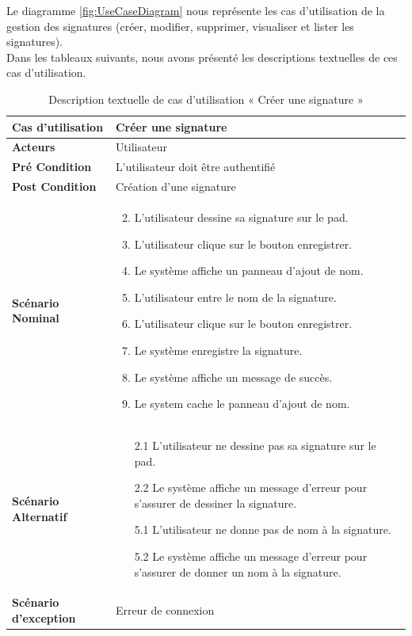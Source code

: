Le diagramme \ref{fig:UseCaseDiagram} nous représente les cas d'utilisation de la gestion des signatures (créer, modifier, supprimer, visualiser et lister les signatures). \\
Dans les tableaux suivants, nous avons présenté les descriptions textuelles de ces cas d'utilisation.


\begin{longtable}{|p{5cm}|p{10cm}|}
  \caption{Description textuelle de cas d'utilisation « Créer une signature »} \label{tab:use_case_create_signature}\\
\hline
\textbf{Cas d'utilisation}&Créer une signature\\
\hline
\textbf{Acteurs}&Utilisateur\\
\hline
\textbf{Pré Condition}&L'utilisateur doit être authentifié\\
\hline
\textbf{Post Condition}&Création d'une signature\\
\hline
\textbf{Scénario Nominal}&
\vspace{-\baselineskip}
\begin{enumerate}
    \setcounter{enumi}{1}
  \item L'utilisateur dessine sa signature sur le pad.
  \item L'utilisateur clique sur le bouton enregistrer.
  \item Le système affiche un panneau d'ajout de nom.
  \item L'utilisateur entre le nom de la signature.
  \item L'utilisateur clique sur le bouton enregistrer.
  \item Le système enregistre la signature.
  \item Le système affiche un message de succès.
  \item Le system cache le panneau d'ajout de nom.
\end{enumerate}\\
\hline
\textbf{Scénario Alternatif}&
\vspace{-\baselineskip}
\begin{enumerate}
      \item [2.1] L'utilisateur ne dessine pas sa signature sur le pad.
      \item [2.2] Le système affiche un message d'erreur pour s'assurer de dessiner la signature.
      \item [5.1] L'utilisateur ne donne pas de nom à la signature.
      \item [5.2] Le système affiche un message d'erreur pour s'assurer de donner un nom à la signature.
\end{enumerate}\\
\hline
\textbf{Scénario d'exception}&Erreur de connexion\\
\hline

\end{longtable}


